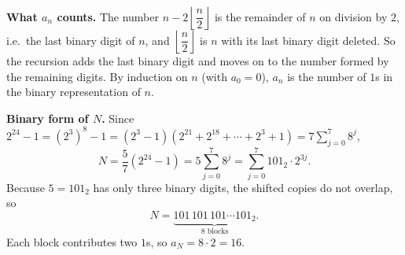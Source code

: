 \textbf{What $a_n$ counts.} The number $n-2\left\lfloor\dfrac {n}{2}\right\rfloor$ is the remainder of $n$ on division by $2$, i.e.\ the last binary digit of $n$, and $\left\lfloor\dfrac {n}{2}\right\rfloor$ is $n$ with its last binary digit deleted. So the recursion adds the last binary digit and moves on to the number formed by the remaining digits. By induction on $n$ (with $a_0=0$), $a_n$ is the number of $1$s in the binary representation of $n$.

\textbf{Binary form of $N$.} Since $2^{24}-1=\left(2^3\right)^8-1=(2^3-1)\left(2^{21}+2^{18}+\cdots+2^3+1\right)=7\sum_{j=0}^{7}8^j$,
\[
N=\dfrac{5}{7}\left(2^{24}-1\right)=5\sum_{j=0}^{7}8^{j}=\sum_{j=0}^{7}101_2\cdot2^{3j}.
\]
Because $5=101_2$ has only three binary digits, the shifted copies do not overlap, so
\[
N=\underbrace{101\,101\,101\cdots101_2}_{8\text{ blocks}} .
\]
Each block contributes two $1$s, so $a_N=8\cdot2=\boxed{16}$.
